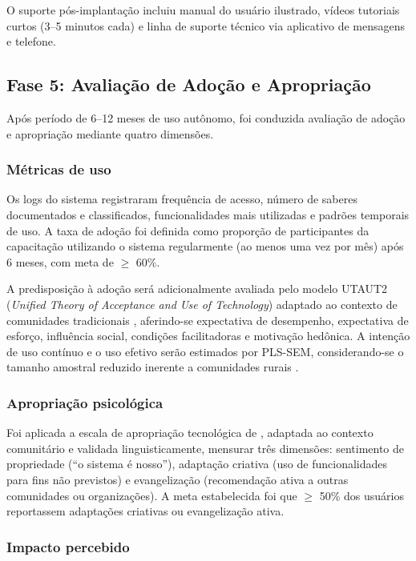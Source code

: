 O suporte pós-implantação incluiu manual do usuário ilustrado, vídeos tutoriais curtos (3--5 minutos cada) e linha de suporte técnico via aplicativo de mensagens e telefone.


\subsection{Fase 5: Avaliação de Adoção e Apropriação}

Após período de 6--12 meses de uso autônomo, foi conduzida avaliação de adoção e apropriação mediante quatro dimensões.

\subsubsection{Métricas de uso}

Os logs do sistema registraram frequência de acesso, número de saberes documentados e classificados, funcionalidades mais utilizadas e padrões temporais de uso. A taxa de adoção foi definida como proporção de participantes da capacitação utilizando o sistema regularmente (ao menos uma vez por mês) após 6 meses, com meta de $\geq$ 60\%.

A predisposição à adoção será adicionalmente avaliada pelo modelo UTAUT2 (\textit{Unified Theory of Acceptance and Use of Technology}) adaptado ao contexto de comunidades tradicionais \cite{Venkatesh2012}, aferindo-se expectativa de desempenho, expectativa de esforço, influência social, condições facilitadoras e motivação hedônica. A intenção de uso contínuo e o uso efetivo serão estimados por PLS-SEM, considerando-se o tamanho amostral reduzido inerente a comunidades rurais \cite{Hair2019b}.

\subsubsection{Apropriação psicológica}

Foi aplicada a escala de apropriação tecnológica de , adaptada ao contexto comunitário e validada linguisticamente, mensurar três dimensões: sentimento de propriedade (``o sistema é nosso''), adaptação criativa (uso de funcionalidades para fins não previstos) e evangelização (recomendação ativa a outras comunidades ou organizações). A meta estabelecida foi que $\geq$ 50\% dos usuários reportassem adaptações criativas ou evangelização ativa.

\subsubsection{Impacto percebido}


